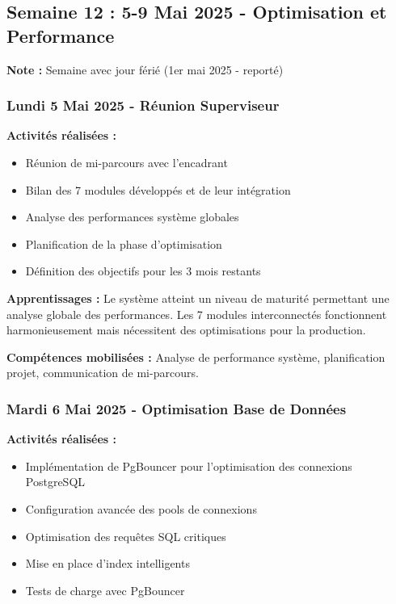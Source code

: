 \subsection{Semaine 12 : 5-9 Mai 2025 - Optimisation et Performance}

\textbf{Note :} Semaine avec jour férié (1er mai 2025 - reporté)

\subsubsection{Lundi 5 Mai 2025 - Réunion Superviseur}

\textbf{Activités réalisées :}
\begin{itemize}
    \item Réunion de mi-parcours avec l'encadrant
    \item Bilan des 7 modules développés et de leur intégration
    \item Analyse des performances système globales
    \item Planification de la phase d'optimisation
    \item Définition des objectifs pour les 3 mois restants
\end{itemize}

\textbf{Apprentissages :}
Le système atteint un niveau de maturité permettant une analyse globale des performances. Les 7 modules interconnectés fonctionnent harmonieusement mais nécessitent des optimisations pour la production.

\textbf{Compétences mobilisées :}
Analyse de performance système, planification projet, communication de mi-parcours.

\subsubsection{Mardi 6 Mai 2025 - Optimisation Base de Données}

\textbf{Activités réalisées :}
\begin{itemize}
    \item Implémentation de PgBouncer pour l'optimisation des connexions PostgreSQL
    \item Configuration avancée des pools de connexions
    \item Optimisation des requêtes SQL critiques
    \item Mise en place d'index intelligents
    \item Tests de charge avec PgBouncer
\end{itemize}

